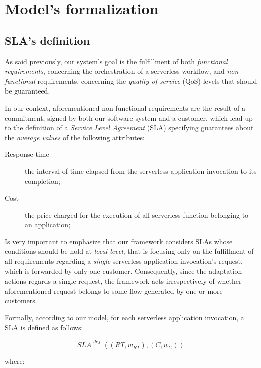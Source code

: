 \documentclass[12pt,a4paper]{report}
\newcommand{\mathDef}{\overset{\textit{def}}{=}}
\begin{document}
\newpage

\chapter{Model's formalization}

\section{SLA's definition}

As said previously, our system's goal is the fulfillment of both \textit{functional requirements}, concerning the orchestration of a serverless workflow, and \textit{non-functional} requirements, concerning the \textit{quality of service} (QoS) levels that should be guaranteed.

In our context, aforementioned non-functional requirements are the result of a commitment, signed by both our software system and a customer, which lead  up to the definition of a \textit{Service Level Agreement} (SLA) specifying guarantees about the \textit{average values} of the following attributes:

\begin{description}
	\item[Response time] the interval of time elapsed from the
	serverless application invocation to its completion;
	\item[Cost] the price charged for the execution of all serverless function belonging to an application;
\end{description}

Is very important to emphasize that our framework considers SLAs whose conditions should be hold at \textit{local level}, that is focusing only on the fulfillment of all requirements regarding a \textit{single} serverless application invocation's request, which is forwarded by only one customer. Consequently, since the adaptation actions regards a single request, the framework acts irrespectively of whether aforementioned request belongs to some flow generated by one or more customers.

Formally, according to our model, for each serverless application invocation, a SLA is defined as follows:

\begin{equation}
	SLA \mathDef \left\langle (RT,w_{RT}),(C,w_{C}) \right\rangle 
\end{equation}
   
where:
\end{document}
